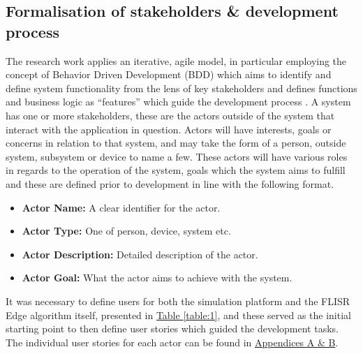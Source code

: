 \subsection{Formalisation of stakeholders \& development process}
\label{sec:setup}

The research work applies an iterative, agile model, in particular employing the concept of Behavior Driven Development (BDD) which aims to
identify and define system functionality from the lens of key stakeholders and defines functions and business logic as ``features'' which guide the development process \cite{9429593}.
A system has one or more stakeholders, these are the actors outside of the system that interact with the application in question. Actors will have interests, goals or concerns in relation to that system, and may take the form of a person, outside system, subsystem or device to name a few.
These actors will have various roles in regards to the operation of the system, goals which the system aims to fulfill and these are defined prior to development in line with the following format.

\begin{itemize}
  \item \textbf{Actor Name:} A clear identifier for the actor.
  \item \textbf{Actor Type:} One of person, device, system etc.
  \item \textbf{Actor Description:} Detailed description of the actor.
  \item \textbf{Actor Goal:} What the actor aims to achieve with the system.
\end{itemize}

\noindent It was necessary to define users for both the simulation platform and the FLISR Edge algorithm itself, presented in \hyperref[table:1]{Table \ref{table:1}}, and these served as the initial starting point to then define user stories
which guided the development tasks. The individual user stories for each actor can be found in \hyperref[sec:appendix_a]{Appendices A \& B}.

